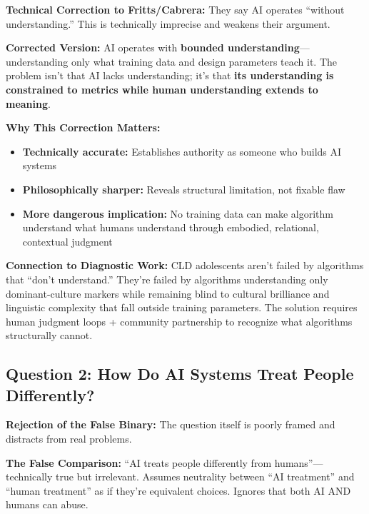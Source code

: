\documentclass[12pt,letterpaper]{article}
\begin{document}
\begin{criticalinsight}
\textbf{Technical Correction to Fritts/Cabrera:} They say AI operates ``without understanding.'' This is technically imprecise and weakens their argument.

\textbf{Corrected Version:} AI operates with \textbf{bounded understanding}—understanding only what training data and design parameters teach it. The problem isn't that AI lacks understanding; it's that \textbf{its understanding is constrained to metrics while human understanding extends to meaning}.
\end{criticalinsight}

\textbf{Why This Correction Matters:}
\begin{itemize}[leftmargin=*,noitemsep]
    \item \textbf{Technically accurate:} Establishes authority as someone who builds AI systems
    \item \textbf{Philosophically sharper:} Reveals structural limitation, not fixable flaw
    \item \textbf{More dangerous implication:} No training data can make algorithm understand what humans understand through embodied, relational, contextual judgment
\end{itemize}

\begin{puzzleplan}
\textbf{Connection to Diagnostic Work:} CLD adolescents aren't failed by algorithms that ``don't understand.'' They're failed by algorithms understanding only dominant-culture markers while remaining blind to cultural brilliance and linguistic complexity that fall outside training parameters. The solution requires human judgment loops + community partnership to recognize what algorithms structurally cannot.
\end{puzzleplan}

\subsection*{Question 2: How Do AI Systems Treat People Differently?}

\begin{criticalinsight}
\textbf{Rejection of the False Binary:} The question itself is poorly framed and distracts from real problems.

\textbf{The False Comparison:} ``AI treats people differently from humans''—technically true but irrelevant. Assumes neutrality between ``AI treatment'' and ``human treatment'' as if they're equivalent choices. Ignores that both AI AND humans can abuse.
\end{criticalinsight}
\end{document}
